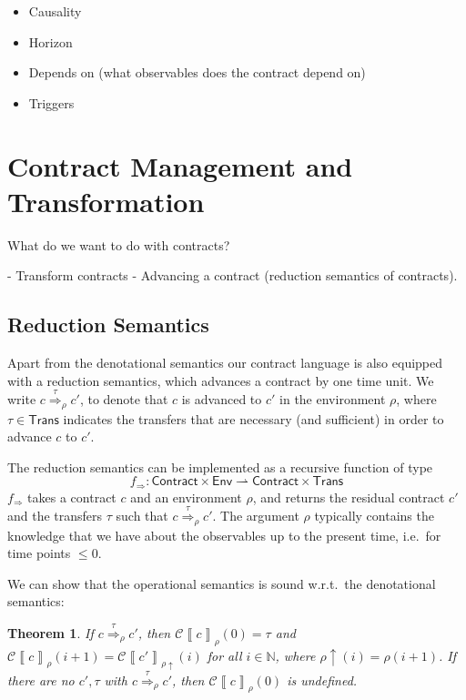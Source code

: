 \documentclass[a4paper,debug,twocolumn]{easychair}
\newcommand\type[1]{\mathsf{#1}}
\newcommand\nats{{\mathbb N}}
\newcommand\pto{\rightharpoonup}
\newcommand\cSem[2]{{\mathcal C}\left\llbracket#1\right\rrbracket_{#2}}
\newcommand\cRed[2]{\stackrel{#2}\Rightarrow_{#1}}
\newcommand\cRedFun{f_{\Rightarrow}}
\newcommand\envAdv[1]{#1\uparrow}
\theoremstyle{plain}
\newtheorem{theorem}{Theorem}
\begin{document}
\begin{itemize}
\item Causality
\item Horizon
\item Depends on (what observables does the contract depend on)
\item Triggers
\end{itemize}


\section{Contract Management and Transformation}
\label{sec:contract-management}

What do we want to do with contracts?

- Transform contracts
- Advancing a contract (reduction semantics of contracts).

\subsection{Reduction Semantics}
\label{sec:reduction-semantics}


Apart from the denotational semantics our contract language is also
equipped with a reduction semantics, which advances a contract by one
time unit. We write $c \cRed \rho \tau c'$, to denote that $c$ is
advanced to $c'$ in the environment $\rho$, where $\tau \in
\type{Trans}$ indicates the transfers that are necessary (and
sufficient) in order to advance $c$ to $c'$.

The reduction semantics can be implemented as a recursive function of
type 
\[
\cRedFun \colon\type{Contract}\times \type{Env} \pto \type{Contract} \times \type{Trans}
\]
$\cRedFun$ takes a contract $c$ and an environment $\rho$, and returns
the residual contract $c'$ and the transfers $\tau$ such that $c
\cRed\rho\tau c'$. The argument $\rho$ typically contains the
knowledge that we have about the observables up to the present time,
i.e.\ for time points $\leq 0$.

We can show that the operational semantics is sound w.r.t.\ the
denotational semantics:
\begin{theorem}
  If $c \cRed\rho\tau c'$, then $\cSem c {\rho} (0) = \tau$ and $\cSem
  c {\rho} (i+1) = \cSem{c'}{\envAdv{\rho}}(i)$ for all $i \in \nats$,
  where $\envAdv{\rho} (i) = \rho(i+1)$. If there are no $c', \tau$
  with $c \cRed\rho\tau c'$, then $\cSem c \rho (0)$ is undefined.
\end{theorem}
\end{document}
